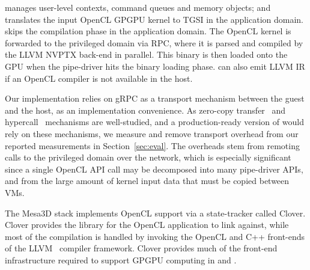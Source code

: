 \trxc manages user-level contexts, command queues and memory objects; and
translates the input OpenCL GPGPU kernel to TGSI in the application domain.
\trxd skips the compilation phase in the application domain.
The OpenCL kernel is forwarded to the privileged domain
via RPC, where it is parsed and compiled by the LLVM NVPTX back-end in
parallel. This binary is then loaded onto the GPU when the pipe-driver hits
the binary loading phase.
\Trillium can also
emit LLVM IR if an OpenCL compiler is not available in the host.



Our implementation relies on gRPC as a transport mechanism between the
guest and the host, as an implementation convenience. As zero-copy
transfer~\cite{chu1996zero,tezuka1998pin} and
hypercall~\cite{ram2010redesigning} mechanisms are well-studied, and
a production-ready version of \Trillium would rely on these mechanisms,
we measure and remove transport
overhead from our reported measurements in Section~\ref{sec:eval}.
The overheads stem from remoting calls to the privileged domain over the network, which is especially significant since a single
OpenCL API call may be decomposed into many pipe-driver APIs, and from
the large amount of kernel input data that must be copied between VMs.

\label{ssec:tgsi_backend}
The Mesa3D stack implements OpenCL support via a state-tracker called Clover.
Clover provides the library for the OpenCL application to link against, while
most of the compilation is handled by invoking the OpenCL and C++ front-ends
of the LLVM~\cite{lattner2004llvm} compiler framework. Clover provides much of
the front-end infrastructure required to support GPGPU computing in \trxc and \Trillium.

